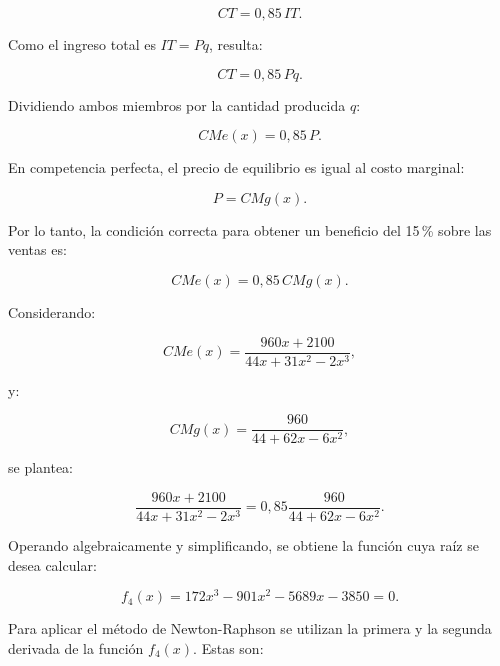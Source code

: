\begin{equation}
    CT = 0{,}85\,IT.
\end{equation}

Como el ingreso total es $IT=Pq$, resulta:

\begin{equation}
    CT = 0{,}85\,Pq.
\end{equation}

Dividiendo ambos miembros por la cantidad producida $q$:

\begin{equation}
    CMe(x) = 0{,}85\,P.
\end{equation}

En competencia perfecta, el precio de equilibrio es igual al costo marginal:

\begin{equation}
    P = CMg(x).
\end{equation}

Por lo tanto, la condición correcta para obtener un beneficio del 15\,\% sobre las ventas es:

\begin{equation}
    CMe(x) = 0{,}85\,CMg(x).
\end{equation}

Considerando:

\begin{equation}
    CMe(x)
    =
    \frac{960x+2100}
    {44x+31x^2-2x^3},
\end{equation}

y:

\begin{equation}
    CMg(x)
    =
    \frac{960}
    {44+62x-6x^2},
\end{equation}

se plantea:

\begin{equation}
    \frac{960x+2100}
    {44x+31x^2-2x^3}
    =
    0{,}85
    \frac{960}
    {44+62x-6x^2}.
\end{equation}

Operando algebraicamente y simplificando, se obtiene la función cuya raíz se desea calcular:

\begin{equation}
    f_4(x)
    =
    172x^3-901x^2-5689x-3850
    =
    0.
    \label{eq:f4}
\end{equation}

Para aplicar el método de Newton-Raphson se utilizan la primera y la segunda derivada de la función $f_4(x)$. Estas son:

